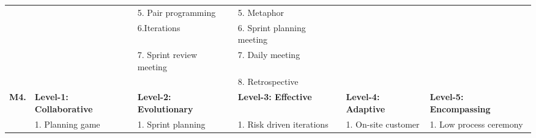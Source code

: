 \documentclass[a4paper,oneside]{bth}
\begin{document}
\begin{longtable}{|p{1.3cm}|p{2cm}|p{2cm}|p{2.7cm}|p{2cm} |p{2cm} |}
				&                                                      & 5. Pair programming                                         & 5. Metaphor                                                                                         & \multirow{4}{*}{}                                      &                                                                                              \\ \cline{3-4}
				&                                                      & 6.Iterations                                                & 6. Sprint planning meeting                                                                          &                                                        &                                                                                              \\ \cline{3-4}
				&                                                      & 7. Sprint review meeting                                    & 7. Daily meeting                                                                                    &                                                        &                                                                                              \\ \cline{3-4}
				&                                                      &                                                             & 8. Retrospective                                                                                    &                                                        &                                                                                              \\ \hline
				\multirow{10}{*}{\textbf{M4.}} & \textbf{Level-1: Collaborative}                      & \textbf{Level-2: Evolutionary}                              & \textbf{Level-3: Effective}                                                                         & \textbf{Level-4: Adaptive}                             & \textbf{Level-5: Encompassing}                                                                        \\ \cline{2-6} 
				& 1. Planning game                                     & 1. Sprint planning                                          & 1. Risk driven iterations                                                                           & 1. On-site customer                                    & 1. Low process ceremony                                                                      \\ \cline{2-6} 

\end{longtable}
\end{document}
